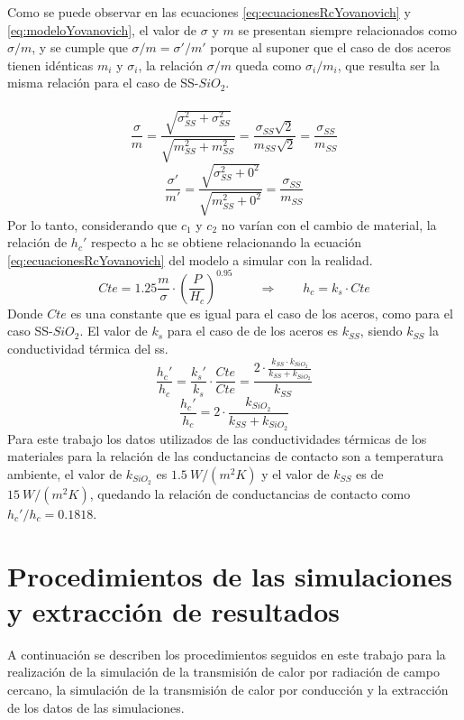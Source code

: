Como se puede observar en las ecuaciones \ref{eq:ecuacionesRcYovanovich} y \ref{eq:modeloYovanovich}, el valor de $\sigma$ y $m$ se presentan siempre relacionados como $\sigma / m$, y se cumple que $\sigma /m =\sigma ' / m'$ porque al suponer que el caso de dos aceros tienen idénticas $m_i$ y $\sigma_i$, la relación $\sigma / m$ queda como $\sigma_i / m_i$, que resulta ser la misma relación para el caso de SS-$SiO_2$.\\\\
\[ \frac{\sigma}{m}=\frac{\sqrt{\sigma_{SS}^2+\sigma_{SS}^2}}{\sqrt{m_{SS}^2+m_{SS}^2}}=\frac{\sigma_{SS}\sqrt{2}}{m_{SS}\sqrt{2}} =\frac{\sigma_{SS}}{m_{SS}}\]
\[ \frac{\sigma'}{m'}=\frac{\sqrt{\sigma_{SS}^2+0^2}}{\sqrt{m_{SS}^2+0^2}}=\frac{\sigma_{SS}}{m_{SS}} \]
Por lo tanto, considerando que $c_1$ y $c_2$ no varían con el cambio de material, la relación de $h_c'$ respecto a \gls{hc} se obtiene relacionando la ecuación \eqref{eq:ecuacionesRcYovanovich} del modelo a simular con la realidad.
\[Cte=1.25\frac{m}{\sigma}\cdot \left(\dfrac{P}{H_c}\right)^{0.95} \qquad \Longrightarrow \qquad h_c=k_s\cdot Cte\]
Donde $Cte$ es una constante que es igual para el caso de los aceros, como para el caso SS-$SiO_2$. El valor de $k_s$ para el caso de de los aceros es $k_{SS}$, siendo $k_{SS}$ la conductividad térmica del \acrshort{ss}. 
\[ \frac{h_c'}{h_c}=\frac{k_s'}{k_s}\cdot \frac{Cte}{Cte}=\frac{2 \cdot \frac{k_{SS}\cdot k_{SiO_2}}{k_{SS}+k_{SiO_2}}}{k_{SS}}\]
\begin{equation}
\frac{h_c'}{h_c}=2\cdot \frac{k_{SiO_2}}{k_{SS}+k_{SiO_2}}
\label{eq:relacion_conductividadesTermicas}
\end{equation}
Para este trabajo los datos utilizados de las conductividades térmicas de los materiales para la relación de las conductancias de contacto son a temperatura ambiente, el valor de $k_{SiO_2}$ es $1.5 \ W/\left( m^2 K\right)$ y el valor de $k_{SS}$ es de $15 \ W/\left( m^2 K\right)$, quedando la relación de conductancias de contacto como ${h_c'}/{h_c}=0.1818$.
\vfill
\section{Procedimientos de las simulaciones y extracción de resultados}
A continuación se describen los procedimientos seguidos en este trabajo para la realización de la simulación de la transmisión de calor por radiación de campo cercano, la simulación de la transmisión de calor por conducción y la extracción de los datos de las simulaciones.\\
